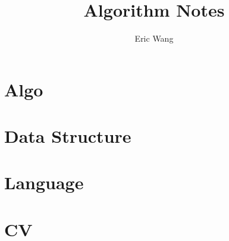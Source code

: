 \documentclass{book}
\begin{document}
\title{Algorithm Notes}
\author{Eric Wang}
\maketitle
\newpage
\tableofcontents
\newpage

\part{Algo}


\part{Data Structure}




\part{Language}


\part{CV}


\end{document}

